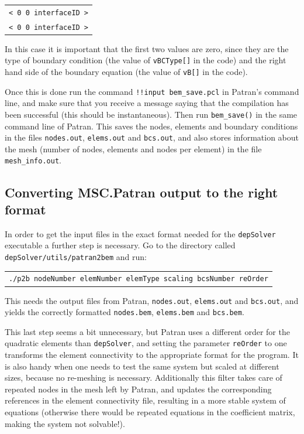 \documentclass[12pt]{article}
\begin{document}
\begin{tabular}{l}
\texttt{< 0 0 interfaceID >}\\
\texttt{< 0 0 interfaceID >}
\end{tabular}

In this case it is important that the first two values are zero, since they are the type of boundary condition (the value of \verb+vBCType[]+ in the code) and the right hand side of the boundary equation (the value of \verb+vB[]+ in the code).

Once this is done run the command \verb+!!input bem_save.pcl+ in Patran's command line, and make sure that you receive a message saying that the compilation has been successful (this should be instantaneous). Then run \verb+bem_save()+ in the same command line of Patran. This saves the nodes, elements and boundary conditions in the files \verb+nodes.out+, \verb+elems.out+ and \verb+bcs.out+, and also stores information about the mesh (number of nodes, elements and nodes per element) in the file \verb+mesh_info.out+.

\subsection{Converting MSC.Patran output to the right format}
In order to get the input files in the exact format needed for the \verb+depSolver+ executable a further step is necessary. Go to the directory called \verb+depSolver/utils/patran2bem+ and run:

\begin{tabular}{l}
\texttt{./p2b nodeNumber elemNumber elemType scaling bcsNumber reOrder}
\end{tabular}

This needs the output files from Patran, \verb+nodes.out+, \verb+elems.out+ and \verb+bcs.out+, and yields the correctly formatted \verb+nodes.bem+, \verb+elems.bem+ and \verb+bcs.bem+.

This last step seems a bit unnecessary, but Patran uses a different order for the quadratic elements than \verb+depSolver+, and setting the parameter \verb+reOrder+ to one transforms the element connectivity to the appropriate format for the program. It is  also handy when one needs to test the same system but scaled at different sizes, because no re-meshing is necessary. Additionally this filter takes care of repeated nodes in the mesh left by Patran, and updates the corresponding references in the element connectivity file, resulting in a more stable system of equations (otherwise there would be repeated equations in the coefficient matrix, making the system not solvable!).
\end{document}

